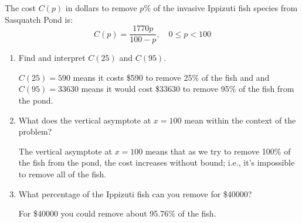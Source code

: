 \documentclass{ximera}
\begin{document}
\begin{problem}
The cost $C(p)$ in dollars to remove $p$\% of the invasive  Ippizuti fish species from Sasquatch Pond is: \[C(p) = \frac{1770p}{100 - p}, \quad 0 \leq p < 100 \]

\begin{enumerate}

\item Find and interpret $C(25)$ and $C(95)$.

\begin{solution}
    $C(25) = 590$ means it costs \$590 to remove 25\% of the fish and and $C(95)= 33630$ means it would cost \$33630 to remove 95\% of the fish from the pond.
\end{solution}

\item What does the vertical asymptote at $x = 100$ mean within the context of the problem?

\begin{solution}
    The vertical asymptote at $x = 100$ means that as we try to remove 100\% of the fish from the pond, the cost increases without bound; i.e., it's impossible to remove all of the fish.
\end{solution}


\item What percentage of the Ippizuti fish can you remove for  \$40000?

\begin{solution}
    For \$40000 you could remove about 95.76\% of the fish.
\end{solution}


\end{enumerate}
\end{problem}
\end{document}
